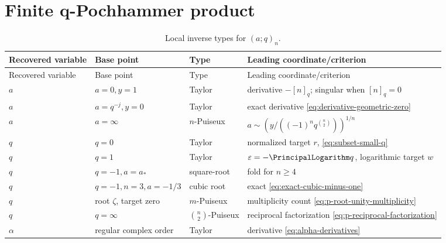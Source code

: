 \documentclass[11pt,letterpaper,oneside,openany]{book}
\theoremstyle{definition}
\theoremstyle{remark}
\begin{document}
\section{Finite q-Pochhammer product}
\begin{longtable}{@{}p{}p{}p{}p{}@{}}
\caption{Local inverse types for \((a;q)_n\).}\label{tab:p-atlas}\\
\toprule
Recovered variable & Base point & Type & Leading coordinate/criterion \\
\midrule
\endfirsthead
\toprule
Recovered variable & Base point & Type & Leading coordinate/criterion \\
\midrule
\endhead
\(a\) & \(a=0,y=1\) & Taylor & derivative \(-[n]_q\); singular when
\([n]_q=0\) \\
\(a\) & \(a=q^{-j},y=0\) & Taylor & exact derivative
\cref{eq:derivative-geometric-zero} \\
\(a\) & \(a=\infty\) & \(n\)-Puiseux &
\(a\sim(y/((-1)^nq^{\binom n2}))^{1/n}\) \\
\(q\) & \(q=0\) & Taylor & normalized target \(r\),
\cref{eq:subset-small-q} \\
\(q\) & \(q=1\) & Taylor & \(\varepsilon=-\PrincipalLogarithm q\), logarithmic target
\(w\) \\
\(q\) & \(q=-1,a=a_*\) & square-root & fold for \(n\ge4\) \\
\(q\) & \(q=-1,n=3,a=-1/3\) & cubic root & exact
\cref{eq:exact-cubic-minus-one} \\
\(q\) & root \(\zeta\), target zero & \(m\)-Puiseux & multiplicity count
\cref{eq:p-root-unity-multiplicity} \\
\(q\) & \(q=\infty\) & \(\binom n2\)-Puiseux & reciprocal factorization
\cref{eq:p-reciprocal-factorization} \\
\(\alpha\) & regular complex order & Taylor & derivative
\cref{eq:alpha-derivatives} \\
\bottomrule
\end{longtable}
\end{document}
